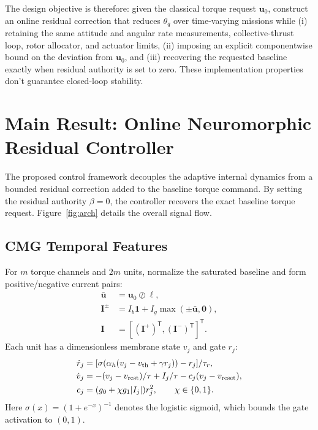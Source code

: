 \documentclass[letterpaper, 10 pt, conference]{ieeeconf}
\newcommand{\T}{^{\mathsf T}}
\begin{document}
The design objective is therefore: given the classical torque request $\bm u_0$, construct an online residual correction that reduces $\theta_q$ over time-varying missions while (i) retaining the same attitude and angular rate measurements, collective-thrust loop, rotor allocator, and actuator limits, (ii) imposing an explicit componentwise bound on the deviation from $\bm u_0$, and (iii) recovering the requested baseline exactly when residual authority is set to zero. These implementation properties don't guarantee closed-loop stability.


\section{Main Result: Online Neuromorphic Residual Controller}
\label{sec:main}
The proposed control framework decouples the adaptive internal dynamics from a bounded residual correction added to the baseline torque command. By setting the residual authority $\beta = 0$, the controller recovers the exact baseline torque request. Figure~\ref{fig:arch} details the overall signal flow.


\subsection{CMG Temporal Features}

For $m$ torque channels and $2m$ units, normalize the saturated baseline and
form positive/negative current pairs:
\begin{equation}
 \begin{aligned}
 \bar{\bm u}&=\bm u_0\oslash\bm\ell,\\
 \bm I^{\pm}&=I_b\bm1+I_g\max(\pm\bar{\bm u},\bm0),\\
 \bm I&=[(\bm I^+)\T,(\bm I^-)\T]\T.
 \end{aligned}
 \label{eq:encoding}
\end{equation}
Each unit has a dimensionless membrane state $v_j$ and gate $r_j$:
\begin{align}
 \dot r_j&=[\sigma(\alpha_h(v_j-v_{\rm th}+\gamma r_j))-r_j]/\tau_r,\\
 \dot v_j&=-(v_j-v_{\rm rest})/\tau+I_j/\tau-c_j(v_j-v_{\rm reset}),\\
 c_j&=(g_0+\chi g_1|I_j|)r_j^2,\qquad \chi\in\{0,1\}.
 \label{eq:cmg}
\end{align}
Here $\sigma(x)=(1+e^{-x})^{-1}$ denotes the logistic sigmoid, which bounds the gate activation to $(0,1)$.
\end{document}
